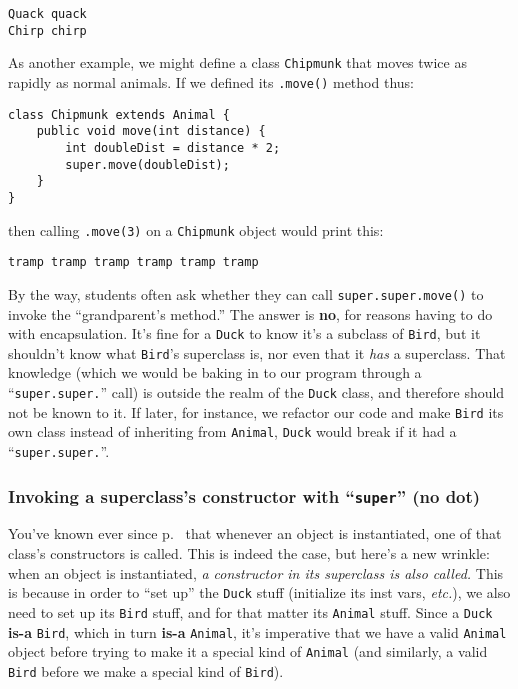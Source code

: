 \begin{Verbatim}[fontsize=\small,samepage=true,frame=none]
Quack quack
Chirp chirp
\end{Verbatim}

As another example, we might define a class \texttt{Chipmunk} that moves twice
as rapidly as normal animals. If we defined its \texttt{.move()} method thus:

\begin{Verbatim}[fontsize=\footnotesize,samepage=true,frame=single]
class Chipmunk extends Animal {
    public void move(int distance) {
        int doubleDist = distance * 2;
        super.move(doubleDist);
    }
}
\end{Verbatim}

then calling \texttt{.move(3)} on a \texttt{Chipmunk} object would print this:

\begin{Verbatim}[fontsize=\small,samepage=true,frame=none]
tramp tramp tramp tramp tramp tramp
\end{Verbatim}

By the way, students often ask whether they can call
\texttt{super.super.move()} to invoke the ``grandparent's method.'' The answer
is \textbf{no}, for reasons having to do with encapsulation. It's fine for a
\texttt{Duck} to know it's a subclass of \texttt{Bird}, but it shouldn't know
what \texttt{Bird}'s superclass is, nor even that it \textit{has} a
superclass. That knowledge (which we would be baking in to our program through
a ``\texttt{super.super.}'' call) is outside the realm of the \texttt{Duck}
class, and therefore should not be known to it. If later, for instance, we
refactor our code and make \texttt{Bird} its own class instead of inheriting
from \texttt{Animal}, \texttt{Duck} would break if it had a
``\texttt{super.super.}''.

\subsubsection{Invoking a superclass's constructor with ``\texttt{super}'' (no
dot)}

You've known ever since p.~\pageref{page:instantiateConstructor} that whenever
an object is instantiated, one of that class's constructors is called. This is
indeed the case, but here's a new wrinkle: when an object is instantiated,
\textit{a constructor in its superclass is also called.} This is because in
order to ``set up'' the \texttt{Duck} stuff (initialize its inst vars,
\textit{etc.}), we also need to set up its \texttt{Bird} stuff, and for that
matter its \texttt{Animal} stuff. Since a \texttt{Duck} \textbf{is-a}
\texttt{Bird}, which in turn \textbf{is-a} \texttt{Animal}, it's imperative
that we have a valid \texttt{Animal} object before trying to make it a
special kind of \texttt{Animal} (and similarly, a valid \texttt{Bird} before
we make a special kind of \texttt{Bird}).

